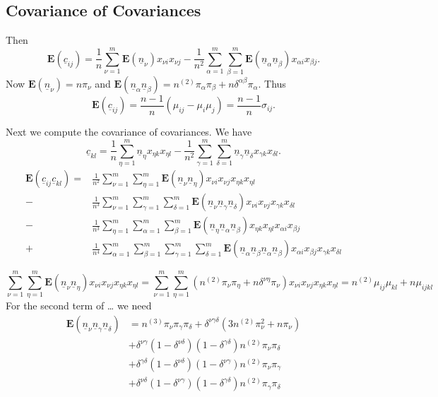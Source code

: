 \documentclass[
  12pt,
  letterpaper,
  DIV=11,
  numbers=noendperiod]{scrartcl}
\newcommand{\ul}[1]{\underline{#1}}
\begin{document}
\subsection{Covariance of Covariances}\label{covariance-of-covariances}

Then \begin{equation}
\mathbf{E}(\ul{c}_{ij})=\frac{1}{n}\sum_{\nu=1}^m\mathbf{E}(\ul{n}_\nu) x_{\nu i}x_{\nu j}-\frac{1}{n^2}\sum_{\alpha=1}^m\sum_{\beta=1}^m\mathbf{E}(\ul{n}_\alpha\ul{n}_\beta) x_{\alpha i}x_{\beta j}.\label{eq-ecov}
\end{equation} Now \(\mathbf{E}(\ul{n}_\nu)=n\pi_\nu\) and
\(\mathbf{E}(\ul{n}_\alpha\ul{n}_\beta)=n^{(2)}\pi_\alpha\pi_\beta+n\delta^{\alpha\beta}\pi_\alpha\).
Thus \begin{equation}
\mathbf{E}(\ul{c}_{ij})=\frac{n-1}{n}(\mu_{ij}-\mu_i\mu_j)=\frac{n-1}{n}\sigma_{ij}.
\label{eq-ecov2}
\end{equation}

Next we compute the covariance of covariances. We have \begin{equation}
\ul{c}_{kl}=\frac{1}{n}\sum_{\eta=1}^m\ul{n}_\eta x_{\eta k}x_{\eta l}-\frac{1}{n^2}\sum_{\gamma=1}^m\sum_{\delta=1}^m\ul{n}_\gamma\ul{n}_\delta x_{\gamma k}x_{\delta l}.
\end{equation} \begin{align}
\mathbf{E}(\ul{c}_{ij}\ul{c}_{kl})=&\frac{1}{n^2}\sum_{\nu=1}^m\sum_{\eta=1}^m\mathbf{E}(\ul{n}_\nu \ul{n}_\eta) x_{\nu i}x_{\nu j}x_{\eta k}x_{\eta l}\\
-&\frac{1}{n^3}\sum_{\nu=1}^m\sum_{\gamma=1}^m\sum_{\delta=1}^m\mathbf{E}(\ul{n}_\nu \ul{n}_\gamma\ul{n}_\delta)x_{\nu i}x_{\nu j}x_{\gamma k}x_{\delta l}\\
-&\frac{1}{n^3}\sum_{\eta=1}^m\sum_{\alpha=1}^m\sum_{\beta=1}^m\mathbf{E}(\ul{n}_\eta \ul{n}_\alpha\ul{n}_\beta)x_{\eta k}x_{\eta l}x_{\alpha i}x_{\beta j}\\
+&\frac{1}{n^4}\sum_{\alpha=1}^m\sum_{\beta=1}^m\sum_{\gamma=1}^m\sum_{\delta=1}^m\mathbf{E}(\ul{n}_\alpha\ul{n}_\beta\ul{n}_\alpha\ul{n}_\beta) x_{\alpha i}x_{\beta j} x_{\gamma k}x_{\delta l}
\end{align}

\[
\sum_{\nu=1}^m\sum_{\eta=1}^m\mathbf{E}(\ul{n}_\nu \ul{n}_\eta) x_{\nu i}x_{\nu j}x_{\eta k}x_{\eta l}=\sum_{\nu=1}^m\sum_{\eta=1}^m(n^{(2)}\pi_\nu\pi_\eta+n\delta^{\nu\eta}\pi_\nu)x_{\nu i}x_{\nu j}x_{\eta k}x_{\eta l}=n^{(2)}\mu_{ij}\mu_{kl}+n\mu_{ijkl}
\] For the second term of \ldots{} we need \begin{align}
\mathbf{E}(\ul{n}_\nu\ul{n}_\gamma\ul{n}_\delta)&=
n^{(3)}\pi_\nu\pi_\gamma\pi_\delta+\delta^{\nu\gamma\delta}(3n^{(2)}\pi_\nu^2+n\pi_\nu)\\
&+\delta^{\nu\gamma}(1-\delta^{\nu\delta})(1-\delta^{\gamma\delta})n^{(2)}\pi_\nu\pi_\delta\\&+\delta^{\gamma\delta}(1-\delta^{\nu\delta})(1-\delta^{\nu\gamma})n^{(2)}\pi_\nu\pi_\gamma\\&+\delta^{\nu\delta}(1-\delta^{\nu\gamma})(1-\delta^{\gamma\delta})n^{(2)}\pi_\gamma\pi_\delta
\end{align}
\end{document}
